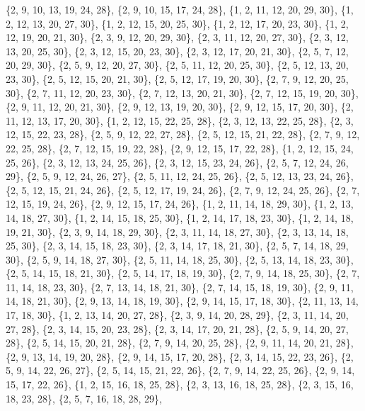 \documentclass[11pt,a4paper]{article}
\begin{document}
{\{2, 9, 10, 13, 19, 24, 28\}, \{2, 9, 10, 15, 17, 24, 28\}, \{1, 2, 11, 12, 20, 29, 30\}, \{1, 2, 12, 13, 20, 27, 30\}, \{1, 2, 12, 15, 20, 25, 30\},
\{1, 2, 12, 17, 20, 23, 30\}, \{1, 2, 12, 19, 20, 21, 30\}, \{2, 3, 9, 12, 20, 29, 30\}, \{2, 3, 11, 12, 20, 27, 30\}, \{2, 3, 12, 13, 20, 25, 30\},
\{2, 3, 12, 15, 20, 23, 30\}, \{2, 3, 12, 17, 20, 21, 30\}, \{2, 5, 7, 12, 20, 29, 30\}, \{2, 5, 9, 12, 20, 27, 30\}, \{2, 5, 11, 12, 20, 25, 30\},
\{2, 5, 12, 13, 20, 23, 30\}, \{2, 5, 12, 15, 20, 21, 30\}, \{2, 5, 12, 17, 19, 20, 30\}, \{2, 7, 9, 12, 20, 25, 30\}, \{2, 7, 11, 12, 20, 23, 30\},
\{2, 7, 12, 13, 20, 21, 30\}, \{2, 7, 12, 15, 19, 20, 30\}, \{2, 9, 11, 12, 20, 21, 30\}, \{2, 9, 12, 13, 19, 20, 30\}, \{2, 9, 12, 15, 17, 20, 30\},
\{2, 11, 12, 13, 17, 20, 30\}, \{1, 2, 12, 15, 22, 25, 28\}, \{2, 3, 12, 13, 22, 25, 28\}, \{2, 3, 12, 15, 22, 23, 28\}, \{2, 5, 9, 12, 22, 27, 28\},
\{2, 5, 12, 15, 21, 22, 28\}, \{2, 7, 9, 12, 22, 25, 28\}, \{2, 7, 12, 15, 19, 22, 28\}, \{2, 9, 12, 15, 17, 22, 28\}, \{1, 2, 12, 15, 24, 25, 26\},
\{2, 3, 12, 13, 24, 25, 26\}, \{2, 3, 12, 15, 23, 24, 26\}, \{2, 5, 7, 12, 24, 26, 29\}, \{2, 5, 9, 12, 24, 26, 27\}, \{2, 5, 11, 12, 24, 25, 26\},
\{2, 5, 12, 13, 23, 24, 26\}, \{2, 5, 12, 15, 21, 24, 26\}, \{2, 5, 12, 17, 19, 24, 26\}, \{2, 7, 9, 12, 24, 25, 26\}, \{2, 7, 12, 15, 19, 24, 26\},
\{2, 9, 12, 15, 17, 24, 26\}, \{1, 2, 11, 14, 18, 29, 30\}, \{1, 2, 13, 14, 18, 27, 30\}, \{1, 2, 14, 15, 18, 25, 30\}, \{1, 2, 14, 17, 18, 23, 30\},
\{1, 2, 14, 18, 19, 21, 30\}, \{2, 3, 9, 14, 18, 29, 30\}, \{2, 3, 11, 14, 18, 27, 30\}, \{2, 3, 13, 14, 18, 25, 30\}, \{2, 3, 14, 15, 18, 23, 30\},
\{2, 3, 14, 17, 18, 21, 30\}, \{2, 5, 7, 14, 18, 29, 30\}, \{2, 5, 9, 14, 18, 27, 30\}, \{2, 5, 11, 14, 18, 25, 30\}, \{2, 5, 13, 14, 18, 23, 30\},
\{2, 5, 14, 15, 18, 21, 30\}, \{2, 5, 14, 17, 18, 19, 30\}, \{2, 7, 9, 14, 18, 25, 30\}, \{2, 7, 11, 14, 18, 23, 30\}, \{2, 7, 13, 14, 18, 21, 30\},
\{2, 7, 14, 15, 18, 19, 30\}, \{2, 9, 11, 14, 18, 21, 30\}, \{2, 9, 13, 14, 18, 19, 30\}, \{2, 9, 14, 15, 17, 18, 30\}, \{2, 11, 13, 14, 17, 18, 30\},
\{1, 2, 13, 14, 20, 27, 28\}, \{2, 3, 9, 14, 20, 28, 29\}, \{2, 3, 11, 14, 20, 27, 28\}, \{2, 3, 14, 15, 20, 23, 28\}, \{2, 3, 14, 17, 20, 21, 28\},
\{2, 5, 9, 14, 20, 27, 28\}, \{2, 5, 14, 15, 20, 21, 28\}, \{2, 7, 9, 14, 20, 25, 28\}, \{2, 9, 11, 14, 20, 21, 28\}, \{2, 9, 13, 14, 19, 20, 28\},
\{2, 9, 14, 15, 17, 20, 28\}, \{2, 3, 14, 15, 22, 23, 26\}, \{2, 5, 9, 14, 22, 26, 27\}, \{2, 5, 14, 15, 21, 22, 26\}, \{2, 7, 9, 14, 22, 25, 26\},
\{2, 9, 14, 15, 17, 22, 26\}, \{1, 2, 15, 16, 18, 25, 28\}, \{2, 3, 13, 16, 18, 25, 28\}, \{2, 3, 15, 16, 18, 23, 28\}, \{2, 5, 7, 16, 18, 28, 29\},
}
\end{document}
